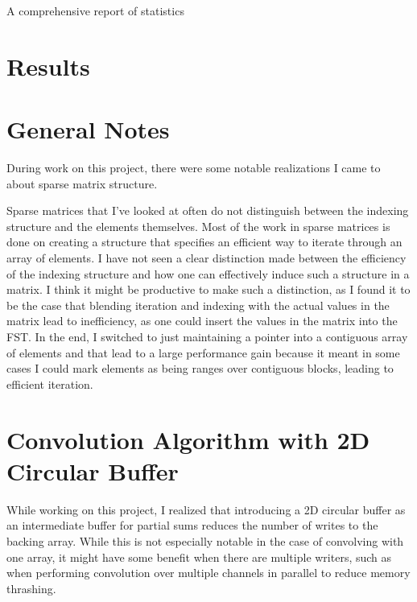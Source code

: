 \documentclass[12pt]{article}
\begin{document}
A comprehensive report of statistics


\section*{Results}

\appendix
\section{General Notes}
During work on this project, there were some notable realizations I came to about sparse matrix
structure.

Sparse matrices that I've looked at often do not distinguish between the indexing structure and
the elements themselves. Most of the work in sparse matrices is done on creating a structure
that specifies an efficient way to iterate through an array of elements. I have not seen a clear
distinction made between the efficiency of the indexing structure and how one can effectively
induce such a structure in a matrix. I think it might be productive to make such a distinction,
as I found it to be the case that blending iteration and indexing with the actual values in the
matrix lead to inefficiency, as one could insert the values in the matrix into the FST. In the
end, I switched to just maintaining a pointer into a contiguous array of elements and that lead
to a large performance gain because it meant in some cases I could mark elements as being ranges
over contiguous blocks, leading to efficient iteration.

\section{Convolution Algorithm with 2D Circular Buffer}
While working on this project, I realized that introducing a 2D circular buffer as an
intermediate buffer for partial sums reduces the
number of writes to the backing array. While this is not especially notable in the case of
convolving with one array, it might have some benefit when there are multiple writers, such as
when performing convolution over multiple channels in parallel to reduce memory thrashing.
\end{document}
